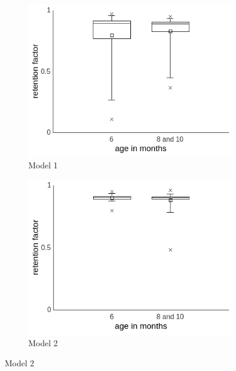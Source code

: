\documentclass[a4paper]{scrreprt}
\begin{document}
\begin{figure}
    \begin{subfigure}[b]{0.49\textwidth}
        \includegraphics[width=\textwidth]{figs/sec3/age/age2_ret_mod1.jpeg}
        \caption{Model 1}
    \end{subfigure}
    \begin{subfigure}[b]{0.49\textwidth}
        \includegraphics[width=\textwidth]{figs/sec3/age/age2_ret_mod2.jpeg}
        \caption{Model 2}
    \end{subfigure}
    

\end{figure}
\end{document}
